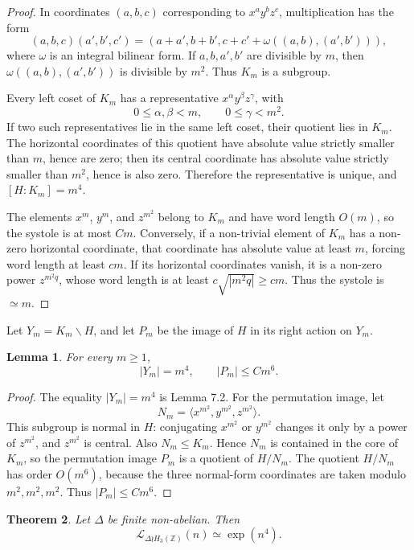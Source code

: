 \documentclass[11pt]{article}
\newcommand{\LEF}{\mathcal L}
\newcommand{\Z}{\mathbb Z}
\newtheorem{theorem}{Theorem}[section]
\newtheorem{lemma}[theorem]{Lemma}
\begin{document}
\begin{proof}
In coordinates \((a,b,c)\) corresponding to \(x^ay^bz^c\), multiplication has the form
\[
(a,b,c)(a',b',c')=(a+a',b+b',c+c'+\omega((a,b),(a',b'))),
\]
where \(\omega\) is an integral bilinear form. If \(a,b,a',b'\) are divisible by \(m\), then \(\omega((a,b),(a',b'))\) is divisible by \(m^2\). Thus \(K_m\) is a subgroup.

Every left coset of \(K_m\) has a representative \(x^\alpha y^\beta z^\gamma\), with
\[
0\le \alpha,\beta<m,\qquad 0\le \gamma<m^2.
\]
If two such representatives lie in the same left coset, their quotient lies in \(K_m\). The horizontal coordinates of this quotient have absolute value strictly smaller than \(m\), hence are zero; then its central coordinate has absolute value strictly smaller than \(m^2\), hence is also zero. Therefore the representative is unique, and \([H:K_m]=m^4\).

The elements \(x^m\), \(y^m\), and \(z^{m^2}\) belong to \(K_m\) and have word length \(O(m)\), so the systole is at most \(Cm\). Conversely, if a non-trivial element of \(K_m\) has a non-zero horizontal coordinate, that coordinate has absolute value at least \(m\), forcing word length at least \(cm\). If its horizontal coordinates vanish, it is a non-zero power \(z^{m^2q}\), whose word length is at least \(c\sqrt{|m^2q|}\ge cm\). Thus the systole is \(\simeq m\).
\end{proof}

Let \(Y_m=K_m\backslash H\), and let \(P_m\) be the image of \(H\) in its right action on \(Y_m\).

\begin{lemma}
For every \(m\ge 1\),
\[
|Y_m|=m^4,\qquad |P_m|\le Cm^6.
\]
\end{lemma}

\begin{proof}
The equality \(|Y_m|=m^4\) is Lemma 7.2. For the permutation image, let
\[
N_m=\langle x^{m^2},y^{m^2},z^{m^2}\rangle.
\]
This subgroup is normal in \(H\): conjugating \(x^{m^2}\) or \(y^{m^2}\) changes it only by a power of \(z^{m^2}\), and \(z^{m^2}\) is central. Also \(N_m\le K_m\). Hence \(N_m\) is contained in the core of \(K_m\), so the permutation image \(P_m\) is a quotient of \(H/N_m\). The quotient \(H/N_m\) has order \(O(m^6)\), because the three normal-form coordinates are taken modulo \(m^2,m^2,m^2\). Thus \(|P_m|\le Cm^6\).
\end{proof}

\begin{theorem}
Let \(\Delta\) be finite non-abelian. Then
\[
\LEF_{\Delta\wr H_3(\Z)}(n)\simeq \exp(n^4).
\]
\end{theorem}
\end{document}
